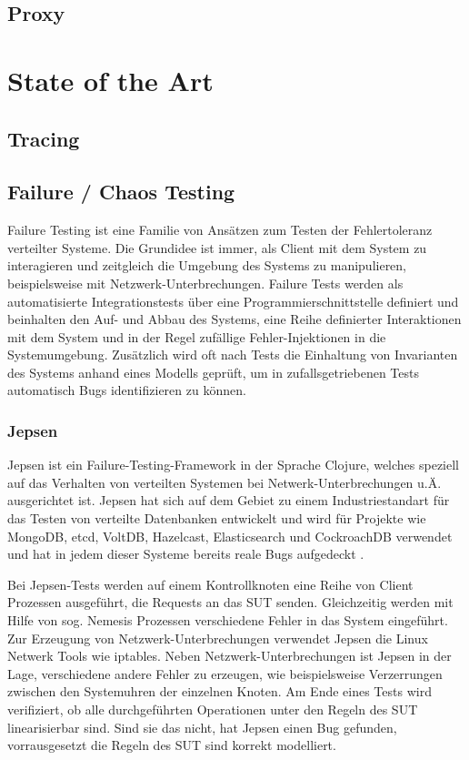 \documentclass[12pt,a4paper]{report}
\begin{document}
\section{Proxy}

\chapter{State of the Art}
\cite{debugging_distributed_systems_2016}
\section{Tracing}
\section{Failure / Chaos Testing}
Failure Testing ist eine Familie von Ansätzen zum Testen der Fehlertoleranz verteilter Systeme. Die Grundidee ist immer, als
Client mit dem System zu interagieren und zeitgleich die Umgebung des Systems zu manipulieren, beispielsweise mit
Netzwerk-Unterbrechungen. Failure Tests werden als automatisierte Integrationstests über eine Programmierschnittstelle definiert
und beinhalten den Auf- und Abbau des Systems, eine Reihe definierter Interaktionen mit dem System und in der Regel zufällige
Fehler-Injektionen in die Systemumgebung. Zusätzlich wird oft nach Tests die Einhaltung von Invarianten des Systems anhand eines
Modells geprüft, um in zufallsgetriebenen Tests automatisch Bugs identifizieren zu können.

\cite{why_is_random_testing_effective}
\cite{failify_masters_thesis}
\subsection{Jepsen}
Jepsen ist ein Failure-Testing-Framework in der Sprache Clojure, welches speziell auf das Verhalten von verteilten Systemen bei
Netwerk-Unterbrechungen u.Ä. ausgerichtet ist. Jepsen hat sich auf dem Gebiet zu einem Industriestandart für das Testen von
verteilte Datenbanken entwickelt \cite{abstracting_the_geniuses} und wird für Projekte wie MongoDB, etcd, VoltDB, Hazelcast,
Elasticsearch und CockroachDB verwendet und hat in jedem dieser Systeme bereits reale Bugs aufgedeckt \cite{jepsen_analyses}.

Bei Jepsen-Tests werden auf einem Kontrollknoten eine Reihe von Client Prozessen ausgeführt, die Requests an das SUT senden.
Gleichzeitig werden mit Hilfe von sog. Nemesis Prozessen verschiedene Fehler in das System eingeführt. Zur Erzeugung von
Netzwerk-Unterbrechungen verwendet Jepsen die Linux Netwerk Tools wie iptables. Neben Netzwerk-Unterbrechungen ist Jepsen in
der Lage, verschiedene andere Fehler zu erzeugen, wie beispielsweise Verzerrungen zwischen den Systemuhren der einzelnen Knoten.
Am Ende eines Tests wird verifiziert, ob alle durchgeführten Operationen unter den Regeln des SUT linearisierbar sind. Sind sie das
nicht, hat Jepsen einen Bug gefunden, vorrausgesetzt die Regeln des SUT sind korrekt modelliert.
\end{document}
